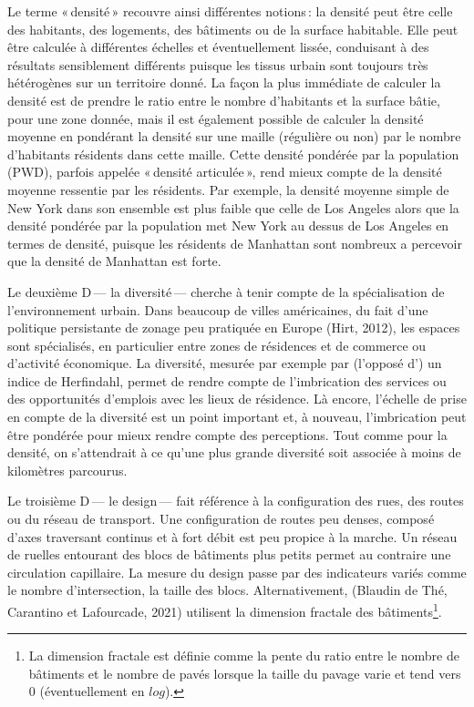\documentclass[
  9pt,
  a4paper,
  DIV=11]{scrreprt}
\begin{document}
Le terme «\,densité\,» recouvre ainsi différentes notions\,: la densité
peut être celle des habitants, des logements, des bâtiments ou de la
surface habitable. Elle peut être calculée à différentes échelles et
éventuellement lissée, conduisant à des résultats sensiblement
différents puisque les tissus urbain sont toujours très hétérogènes sur
un territoire donné. La façon la plus immédiate de calculer la densité
est de prendre le ratio entre le nombre d'habitants et la surface bâtie,
pour une zone donnée, mais il est également possible de calculer la
densité moyenne en pondérant la densité sur une maille (régulière ou
non) par le nombre d'habitants résidents dans cette maille. Cette
densité pondérée par la population (PWD), parfois appelée «\,densité
articulée\,», rend mieux compte de la densité moyenne ressentie par les
résidents. Par exemple, la densité moyenne simple de New York dans son
ensemble est plus faible que celle de Los Angeles alors que la densité
pondérée par la population met New York au dessus de Los Angeles en
termes de densité, puisque les résidents de Manhattan sont nombreux a
percevoir que la densité de Manhattan est forte.

Le deuxième D\,--- la diversité\,--- cherche à tenir compte de la
spécialisation de l'environnement urbain. Dans beaucoup de villes
américaines, du fait d'une politique persistante de zonage peu pratiquée
en Europe (Hirt, 2012), les espaces sont spécialisés, en particulier
entre zones de résidences et de commerce ou d'activité économique. La
diversité, mesurée par exemple par (l'opposé d') un indice de
Herfindahl, permet de rendre compte de l'imbrication des services ou des
opportunités d'emplois avec les lieux de résidence. Là encore, l'échelle
de prise en compte de la diversité est un point important et, à nouveau,
l'imbrication peut être pondérée pour mieux rendre compte des
perceptions. Tout comme pour la densité, on s'attendrait à ce qu'une
plus grande diversité soit associée à moins de kilomètres parcourus.

Le troisième D\,--- le design\,--- fait référence à la configuration des
rues, des routes ou du réseau de transport. Une configuration de routes
peu denses, composé d'axes traversant continus et à fort débit est peu
propice à la marche. Un réseau de ruelles entourant des blocs de
bâtiments plus petits permet au contraire une circulation capillaire. La
mesure du design passe par des indicateurs variés comme le nombre
d'intersection, la taille des blocs. Alternativement, (Blaudin de Thé,
Carantino et Lafourcade, 2021) utilisent la dimension fractale des
bâtiments\footnote{La dimension fractale est définie comme la pente du
  ratio entre le nombre de bâtiments et le nombre de pavés lorsque la
  taille du pavage varie et tend vers 0 (éventuellement en \(log\)).}.
\end{document}
